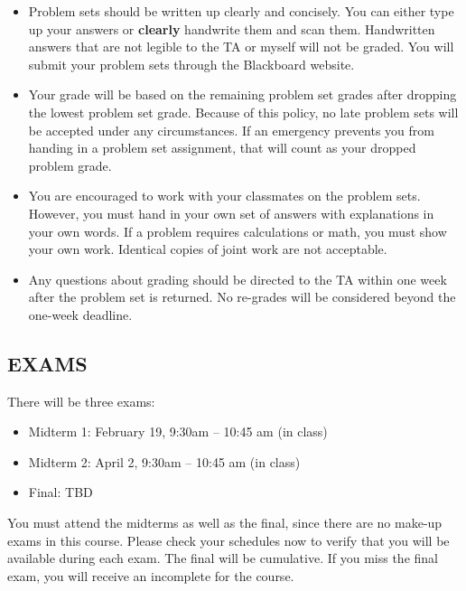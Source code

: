 \documentclass[12pt]{article}
\begin{document}
\begin{itemize}
    \item Problem sets should be written up clearly and concisely.
    You can either type up your answers or \textbf{clearly} handwrite them and scan them.
    Handwritten answers that are not legible to the TA or myself will not be graded.
    You will submit your problem sets through the Blackboard website.

    \item Your grade will be based on the remaining problem set grades after dropping
    the lowest problem set grade.
    Because of this policy,
    no late problem sets will be accepted under any circumstances.
    If an emergency prevents you from handing in a problem set assignment,
    that will count as your dropped problem grade. 

    \item You are encouraged to work with your classmates on the problem sets. 
    However, you must hand in your own set of answers with explanations in your own words. 
    If a problem requires calculations or math, you must show your own work. 
    Identical copies of joint work are not acceptable.

    \item Any questions about grading should be directed to the TA within one week
    after the problem set is returned.
    No re-grades will be considered beyond the one-week deadline.
\end{itemize}



\subsection*{EXAMS}

There will be three exams:

\begin{itemize}
    \item Midterm 1: February 19, 9:30am -- 10:45 am (in class)
    \item Midterm 2: April 2, 9:30am -- 10:45 am (in class)
    \item Final: TBD
\end{itemize}

\noindent You must attend the midterms as well as the final,
since there are no make-up exams in this course. 
Please check your schedules now to verify that you will be available during each exam.
The final will be cumulative.
If you miss the final exam, you will receive an incomplete for the course.
\end{document}
